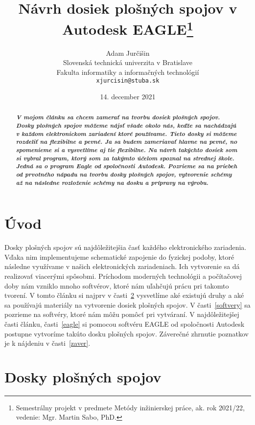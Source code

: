\documentclass[12pt,slovak,a4paper, twocolumn]{article}
\title{Návrh dosiek plošných spojov v Autodesk EAGLE\thanks{Semestrálny projekt v predmete Metódy inžinierskej práce, ak. rok 2021/22, vedenie: Mgr. Martin Sabo, PhD.}}
\author{Adam Jurčišin\\[2pt]
	{\small Slovenská technická univerzita v Bratislave}\\
	{\small Fakulta informatiky a informačných technológií}\\
	{\small \texttt{xjurcisin@stuba.sk}}
	}
\date{\small 14. december 2021}
\begin{document}
\maketitle

\begin{abstract}
\textit{\textbf{V mojom článku sa chcem zamerať na tvorbu dosiek plošných spojov. Dosky plošných spojov môžeme nájsť všade okolo nás, keďže sa nachádzajú v každom elektronickom zariadení ktoré používame. Tieto dosky si môžeme rozdeliť na flexibilne a pevné. Ja sa budem zameriavať hlavne na pevné, no spomenieme si a vysvetlíme aj tie flexibilne. Na návrh takýchto dosiek som si vybral program, ktorý som za takýmto účelom spoznal na strednej škole. Jedná sa o program Eagle od spoločnosti Autodesk. Pozrieme sa na priebeh od prvotného nápadu na tvorbu dosky plošných spojov, vytvorenie schémy až na následne rozloženie schémy na dosku a prípravy na výrobu.}}
\end{abstract}



\section{Úvod}
\paragraph{} Dosky plošných spojov sú najdôležitejšia časť každého elektronického zariadenia. Vďaka nim implementujeme schematické zapojenie do fyzickej podoby, ktoré následne využívame v našich elektronických zariadeniach. Ich vytvorenie sa dá realizovať viacerými spôsobmi. Príchodom moderných technológii  a počítačovej doby nám vzniklo mnoho softvérov, ktoré nám uľahčujú prácu pri takomto tvorení. V tomto článku si najprv v časti~\ref{dps} vysvetlíme aké existujú druhy a aké sa používajú materiály na vytvorenie dosiek plošných spojov. V časti~\ref{softvery} sa pozrieme na softvéry, ktoré nám môžu pomôcť pri vytváraní. V najdôležitejšej časti článku, časti~\ref{eagle} si pomocou softvéru EAGLE od spoločnosti Autodesk postupne vytvoríme takúto dosku plošných spojov. Záverečné zhrnutie poznatkov je k nájdeniu v časti~\ref{zaver}.


\section{Dosky plošných spojov} \label{dps}
\end{document}
